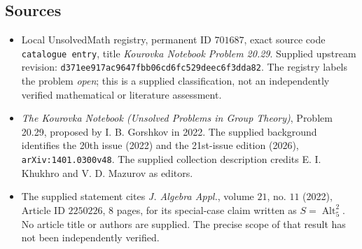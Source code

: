 \documentclass[11pt]{article}
\begin{document}
\subsection{Sources}
\begin{itemize}
\item Local UnsolvedMath registry, permanent ID \(701687\), exact source code \texttt{catalogue entry}, title \emph{Kourovka Notebook Problem 20.29}. Supplied upstream revision: \texttt{d371ee917ac9647fbb06cd6fc529deec6f3dda82}. The registry labels the problem \emph{open}; this is a supplied classification, not an independently verified mathematical or literature assessment.
\item \emph{The Kourovka Notebook (Unsolved Problems in Group Theory)}, Problem 20.29, proposed by I. B. Gorshkov in 2022. The supplied background identifies the 20th issue (2022) and the 21st-issue edition (2026), \texttt{arXiv:1401.0300v48}. The supplied collection description credits E. I. Khukhro and V. D. Mazurov as editors.
\item The supplied statement cites \emph{J. Algebra Appl.}, volume \(21\), no. \(11\) (2022), Article ID \(2250226\), 8 pages, for its special-case claim written as \(S=\operatorname{Alt}_5^2\). No article title or authors are supplied. The precise scope of that result has not been independently verified.
\end{itemize}
\end{document}
